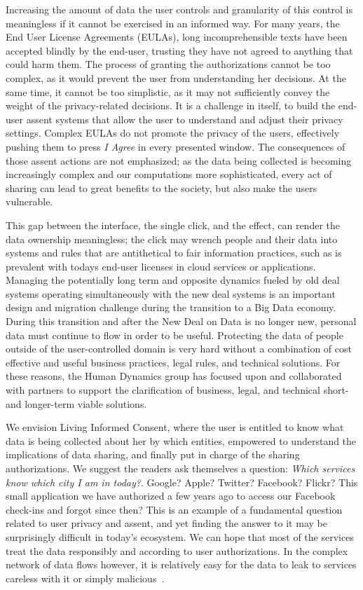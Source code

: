Increasing the amount of data the user controls and granularity of this control is meaningless if it cannot be exercised in an informed way.
For many years, the End User License Agreements (EULAs), long incomprehensible texts have been accepted blindly by the end-user, trusting they have not agreed to anything that could harm them.
The process of granting the authorizations cannot be too complex, as it would prevent the user from understanding her decisions.
At the same time, it cannot be too simplistic, as it may not sufficiently convey the weight of the privacy-related decisions.
It is a challenge in itself, to build the end-user assent systems that allow the user to understand and adjust their privacy settings.
Complex EULAs do not promote the privacy of the users, effectively pushing them to press \emph{I Agree} in every presented window.
The consequences of those assent actions are not emphasized; as the data being collected is becoming increasingly complex and our computations more sophisticated, every act of sharing can lead to great benefits to the society, but also make the users vulnerable.

This gap between the interface, the single click, and the effect, can render the data ownership meaningless; the click may wrench people and their data into systems and rules that are antithetical to fair information practices, such as is prevalent with todays end-user licenses in cloud services or applications.
Managing the potentially long term and opposite dynamics fueled by old deal systems operating simultaneously with the new deal systems is an important design and migration challenge during the transition to a Big Data economy.
During this transition and after the New Deal on Data is no longer new, personal data must continue to flow in order to be useful.
Protecting the data of people outside of the user-controlled domain is very hard without a combination of cost effective and useful business practices, legal rules, and technical solutions.
For these reasons, the Human Dynamics group has focused upon and collaborated with partners to support the clarification of business, legal, and technical short- and longer-term viable solutions.

We envision Living Informed Consent, where the user is entitled to know what data is being collected about her by which entities, empowered to understand the implications of data sharing, and finally put in charge of the sharing authorizations.
We suggest the readers ask themselves a question: \emph{Which services know which city I am in today?}.
Google? Apple? Twitter? Facebook? Flickr?
This small application we have authorized a few years ago to access our Facebook check-ins and forgot since then? 
This is an example of a fundamental question related to user privacy and assent, and yet finding the answer to it may be surprisingly difficult in today's ecosystem.
We can hope that most of the services treat the data responsibly and according to user authorizations.
In the complex network of data flows however, it is relatively easy for the data to leak to services careless with it or simply malicious~\cite{biltongirls}.

